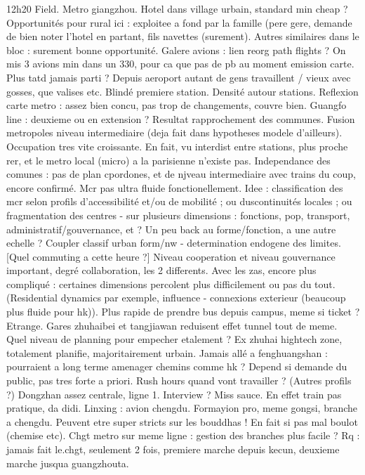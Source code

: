 12h20
Field. Metro giangzhou.
Hotel dans village urbain, standard min cheap ? Opportunités pour rural ici : exploitee a fond par la famille (pere gere, demande de bien noter l'hotel en partant, fils navettes (surement). Autres similaires dans le bloc : surement bonne opportunité.
Galere avions : lien reorg path flights ? On mis 3 avions min dans un 330, pour ca que pas de pb au moment emission carte. Plus tatd jamais parti ?
Depuis aeroport autant de gens travaillent / vieux avec gosses, que valises etc. Blindé premiere station.
Densité autour stations. Reflexion carte metro : assez bien concu, pas trop de changements, couvre bien. Guangfo line : deuxieme ou en extension ? Resultat rapprochement des communes. Fusion metropoles niveau intermediaire (deja fait dans hypotheses modele d'ailleurs). Occupation tres vite croissante. En fait, vu interdist entre stations, plus proche rer, et le metro local (micro) a la parisienne n'existe pas. Independance des comunes : pas de plan cpordones, et de njveau intermediaire avec trains du coup, encore confirmé. Mcr pas ultra fluide fonctionellement. Idee : classification des mcr selon profils d'accessibilité et/ou de mobilité ; ou duscontinuités locales ; ou fragmentation des centres - sur plusieurs dimensions : fonctions, pop, transport, administratif/gouvernance, et ?
Un peu back au forme/fonction, a une autre echelle ?
Coupler classif urban form/nw - determination endogene des limites.
[Quel commuting a cette heure ?]
Niveau cooperation et niveau gouvernance important, degré collaboration, les 2 differents. Avec les zas, encore plus compliqué : certaines dimensions percolent plus difficilement ou pas du tout. (Residential dynamics par exemple, influence - connexions exterieur (beaucoup plus fluide pour hk)).
Plus rapide de prendre bus depuis campus, meme si ticket ? Etrange. Gares zhuhaibei et tangjiawan reduisent effet tunnel tout de meme.
Quel niveau de planning pour empecher etalement ? Ex zhuhai hightech zone, totalement planifie, majoritairement urbain.
Jamais allé a fenghuangshan : pourraient a long terme amenager chemins comme hk ? Depend si demande du public, pas tres forte a priori.
Rush hours quand vont travailler ? (Autres profils ?)
Dongzhan assez centrale, ligne 1.
Interview ? Miss sauce. En effet train pas pratique, da didi. Linxing : avion chengdu. Formayion pro, meme gongsi, branche a chengdu. Peuvent etre super stricts sur les bouddhas !
En fait si pas mal boulot (chemise etc).
Chgt metro sur meme ligne : gestion des branches plus facile ? Rq : jamais fait le.chgt, seulement 2 fois, premiere marche depuis kecun, deuxieme marche jusqua guangzhouta.

